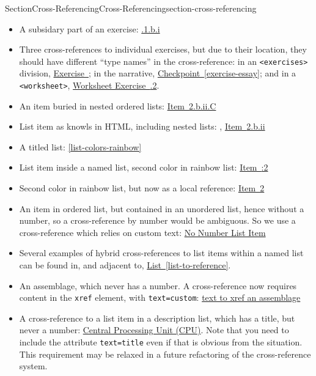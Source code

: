 \documentclass[twoside,10pt,]{article}
\newcommand{\xreffont}{\relax}
\newcommand{\mono}[1]{\texttt{#1}}
\numberwithin{equation}{section}
\begin{document}
\begin{sectionptx}{Section}{Cross-Referencing}{}{Cross-Referencing}{}{}{section-cross-referencing}
\begin{itemize}[label=\textbullet]
\item{}A subsidary part of an exercise: \hyperlink{exercise-one-two-one}{{\xreffont 12.10.1.b.i}}%
\item{} Three cross-references to individual exercises, but due to their location, they should have different ``type names'' in the cross-reference: in an \mono{<exercises>} division, \hyperlink{duplicate-divisional}{Exercise~{\xreffont 36.2}}; in the narrative, \hyperref[exercise-essay]{Checkpoint~{\xreffont\ref{exercise-essay}}}; and in a \mono{<worksheet>}, \hyperlink{exercise-vector-addition}{Worksheet Exercise~{\xreffont 35.1.2}}.%
\item{}An item buried in nested ordered lists: \hyperlink{list-two-two-two-three}{Item~{\xreffont 2.b.ii.C}}%
\item{}List item as knowls in HTML, including nested lists: \hyperlink{list-two}{{\xreffont 2}}, \hyperlink{list-two-two-two}{Item~{\xreffont 2.b.ii}}%
\item{}A titled list: \hyperref[list-colors-rainbow]{{\xreffont\ref{list-colors-rainbow}}}%
\item{}List item inside a named list, second color in rainbow list: \hyperlink{rainbow-orange}{Item~{\xreffont 12.3:2}}%
\item{}Second color in rainbow list, but now as a local reference: \hyperlink{rainbow-orange}{Item~2}%
\item{}An item in ordered list, but contained in an unordered list, hence without a number, so a cross-reference by number would be ambiguous.  So we use a cross-reference which relies on custom text: \hyperlink{target-no-number}{No Number List Item}%
\item{}Several examples of hybrid cross-references to list items within a named list can be found in, and adjacent to, \hyperref[list-to-reference]{List~{\xreffont\ref{list-to-reference}}}.%
\item{}An assemblage, which never has a number.  A cross-reference now requires content in the \mono{xref} element, with \mono{text=\textquotesingle{}custom\textquotesingle{}}: \hyperref[assemblage-basics]{text to xref an assemblage}%
\item{}A cross-reference to a list item in a description list, which has a title, but never a number: \hyperlink{cpu-definition}{Central Processing Unit (CPU)}.  Note that you need to include the attribute \mono{text=\textquotedbl{}title\textquotedbl{}} even if that is obvious from the situation.  This requirement may be relaxed in a future refactoring of the cross-reference system.%

\end{itemize}
\end{sectionptx}
\end{document}
